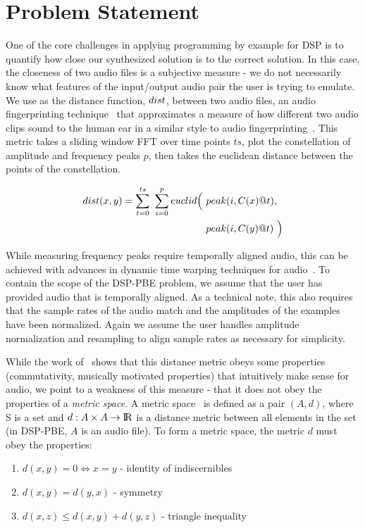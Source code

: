
\section{Problem Statement}

One of the core challenges in applying programming by example for DSP is to quantify how close our synthesized solution is to the correct solution.
In this case, the closeness of two audio files is a subjective measure - we do not necessarily know what features of the input/output audio pair the user is trying to emulate.
We use as the distance function, ${dist}$, between two audio files, an audio fingerprinting technique~\cite{SantolucitoFARM} that approximates a measure of how different two audio clips sound to the human ear in a similar style to audio fingerprinting~\cite{wang2003industrial,fingerprinting}.
This metric takes a sliding window FFT over time points $ts$, plot the constellation of amplitude and frequency peaks $p$, then takes the euclidean distance between the points of the constellation.

%
\begin{align*}
\distFxn(x,y) =  \sum_{t=0}^{ts}\ \sum_{i=0}^{p} euclid\Big(\ &peak(i,C(x)@t), \\ &peak(i,C(y)@t)\ \Big)
\end{align*}
%

While measuring frequency peaks require temporally aligned audio, this can be achieved with advances in dynamic time warping techniques for audio~\cite{carabias2015audio}.
To contain the scope of the DSP-PBE problem, we assume that the user has provided audio that is temporally aligned.
As a technical note, this also requires that the sample rates of the audio match and the amplitudes of the examples have been normalized.
Again we assume the user handles amplitude normalization and resampling to align sample rates as necessary for simplicity.

While the work of~\cite{SantolucitoFARM} shows that this distance metric obeys some properties (commutativity, musically motivated properties) that intuitively make sense for audio,
  we point to a weakness of this measure - that it does not obey the properties of a \textit{metric space}.
A metric space~\cite{frechet1906quelques} is defined as a pair $(A,d)$, where S is a set and $d:A \times A \to {\rm I\!R}$ is a distance metric between all elements in the set (in DSP-PBE, $A$ is an audio file).
To form a metric space, the metric $d$ must obey the properties:

\begin{enumerate}
  \item $d(x,y) = 0 \Leftrightarrow x = y$ - identity of indiscernibles
  \item $d(x,y)  = d(y,x)$ - symmetry
  \item $d(x,z) \le d(x,y) + d(y, z)$ - triangle inequality
\end{enumerate}

